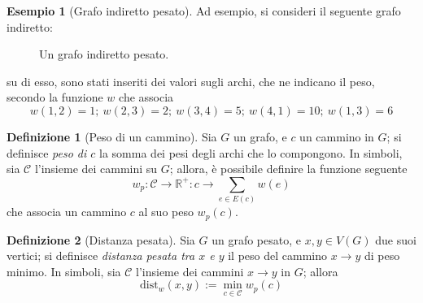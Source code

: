 \documentclass[14pt]{extreport}
\theoremstyle{definition}
\newtheorem{definition}{Definizione}[subsection]
\theoremstyle{definition}
\newtheorem{example}{Esempio}[subsection]
\begin{document}
\begin{example}[Grafo indiretto pesato]
    Ad esempio, si consideri il seguente grafo indiretto:

    \begin{figure}[H]
        \centering
        \caption{Un grafo indiretto pesato.}
    \end{figure}

    su di esso, sono stati inseriti dei valori sugli archi, che ne indicano il peso, secondo la funzione $w$ che associa $$w(1, 2) = 1; \ w(2,3)=2; \ w(3, 4)=5; \ w(4, 1)=10; \ w(1,3)=6$$
\end{example}

\begin{definition}[Peso di un cammino]
    Sia $G$ un grafo, e $c$ un cammino in $G$; si definisce \textit{peso di $c$} la somma dei pesi degli archi che lo compongono. In simboli, sia $\mathcal {C}$ l'insieme dei cammini su $G$; allora, è possibile definire la funzione seguente $$w_p : \mathcal{C} \rightarrow \mathbb{R}^+: c \rightarrow \displaystyle \sum_{e \in E(c)}{w(e)}$$ che associa un cammino $c$ al suo peso $w_p(c)$.
\end{definition}

\begin{definition}[Distanza pesata]
    Sia $G$ un grafo pesato, e $x, y \in V(G)$ due suoi vertici; si definisce \textit{distanza pesata tra $x$ e $y$} il peso del cammino $x \rightarrow y$ di peso minimo. In simboli, sia $\mathcal{C}$ l'insieme dei cammini $x \rightarrow y$ in $G$; allora $$\mathrm{dist}_w(x, y) := \min_{c \in \mathcal{C}}{w_p(c)}$$
\end{definition}
\end{document}
